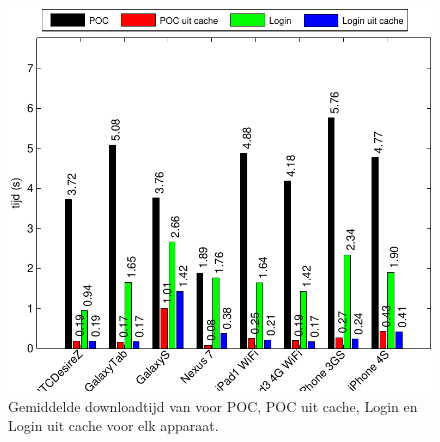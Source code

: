\begin{figure}[H]
  \centering
  \includegraphics[width=\textwidth]{figuren/performance-lungo.pdf}
  \caption{Gemiddelde downloadtijd van \lungo{} voor POC,  POC uit cache,  Login en Login uit cache voor elk apparaat.}
  \label{fig:performantie-lungo}
\end{figure}
